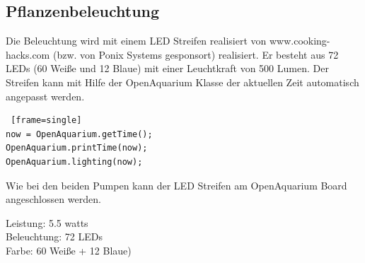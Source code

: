 \documentclass[11pt]{article}
\begin{document}
\subsection{Pflanzenbeleuchtung}
Die Beleuchtung wird mit einem LED Streifen realisiert von www.cooking-hacks.com (bzw. von Ponix Systems gesponsort) realisiert. Er besteht aus 72 LEDs (60 Weiße und 12 Blaue) mit einer Leuchtkraft von 500 Lumen. Der Streifen kann mit Hilfe der OpenAquarium Klasse der aktuellen Zeit automatisch angepasst werden.
\begin{lstlisting} [frame=single]
now = OpenAquarium.getTime();
OpenAquarium.printTime(now);
OpenAquarium.lighting(now);
\end{lstlisting}
Wie bei den beiden Pumpen kann der LED Streifen am OpenAquarium Board angeschlossen werden. \\
\begin{minipage}{5in}
  \centering
\end{minipage} 
Leistung: 5.5 watts \\
Beleuchtung: 72 LEDs \\
Farbe: 60 Weiße + 12 Blaue) \\
\end{document}
